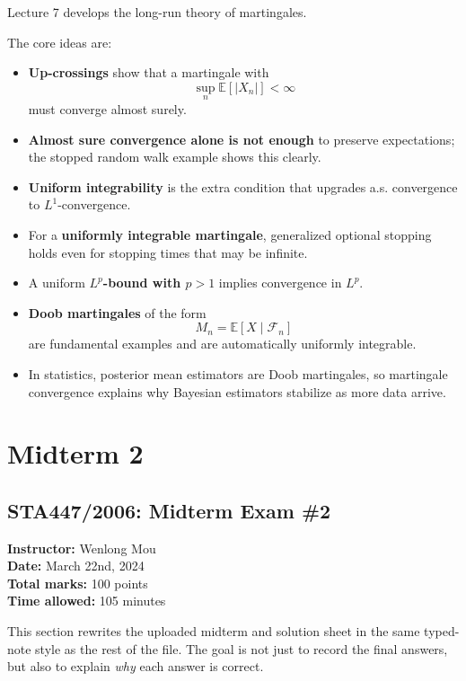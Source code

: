 \documentclass[11pt]{article}
\theoremstyle{definition}
\begin{document}
\begin{summarybox}
Lecture 7 develops the long-run theory of martingales.

The core ideas are:
\begin{itemize}[leftmargin=2em]
    \item \textbf{Up-crossings} show that a martingale with
    \[
    \sup_n \mathbb E[|X_n|] < \infty
    \]
    must converge almost surely.
    \item \textbf{Almost sure convergence alone is not enough} to preserve expectations; the stopped random walk example shows this clearly.
    \item \textbf{Uniform integrability} is the extra condition that upgrades a.s. convergence to \(L^1\)-convergence.
    \item For a \textbf{uniformly integrable martingale}, generalized optional stopping holds even for stopping times that may be infinite.
    \item A uniform \textbf{\(L^p\)-bound with \(p>1\)} implies convergence in \(L^p\).
    \item \textbf{Doob martingales} of the form
    \[
    M_n = \mathbb E[X\mid \mathcal F_n]
    \]
    are fundamental examples and are automatically uniformly integrable.
    \item In statistics, posterior mean estimators are Doob martingales, so martingale convergence explains why Bayesian estimators stabilize as more data arrive.
\end{itemize}
\end{summarybox}

\section{Midterm 2}

\subsection*{STA447/2006: Midterm Exam \#2}
\textbf{Instructor:} Wenlong Mou\\
\textbf{Date:} March 22nd, 2024\\
\textbf{Total marks:} 100 points\\
\textbf{Time allowed:} 105 minutes

This section rewrites the uploaded midterm and solution sheet in the same typed-note style as the rest of the file. The goal is not just to record the final answers, but also to explain \emph{why} each answer is correct.
\end{document}
